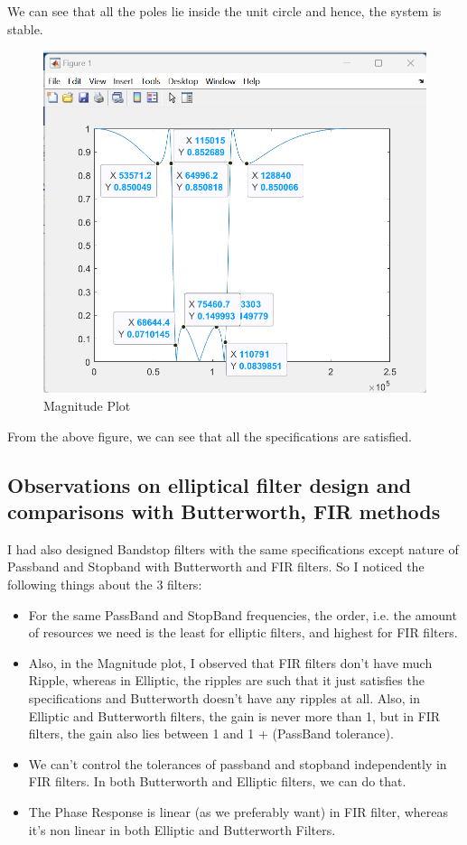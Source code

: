 \documentclass{article}
\begin{document}
We can see that all the poles lie inside the unit circle and hence, the system is stable.

\begin{figure}[h!]

\centering
\includegraphics[scale = 0.58]{Elliptic_freq_BandStop.png}
\caption{Magnitude Plot}
\end{figure}

From the above figure, we can see that all the specifications are satisfied.

\subsection{Observations on elliptical filter design and comparisons with Butterworth, FIR methods}

I had also designed Bandstop filters with the same specifications except nature of Passband and Stopband with Butterworth and FIR filters. So I noticed the following things about the 3 filters:

\begin{itemize}
    \item For the same PassBand and StopBand frequencies, the order, i.e. the amount of resources we need is the least for elliptic filters, and highest for FIR filters.
    \item Also, in the Magnitude plot, I observed that FIR filters don't have much Ripple, whereas in Elliptic, the ripples are such that it just satisfies the specifications and Butterworth doesn't have any ripples at all. Also, in Elliptic and Butterworth filters, the gain is never more than 1, but in FIR filters, the gain also lies between 1 and 1 + (PassBand tolerance).
    \item We can’t control the tolerances of passband and stopband independently in FIR filters. In both Butterworth and Elliptic filters, we can do that.
    \item The Phase Response is linear (as we preferably want) in FIR filter, whereas it's non linear in both Elliptic and Butterworth Filters.
\end{itemize}
\end{document}
